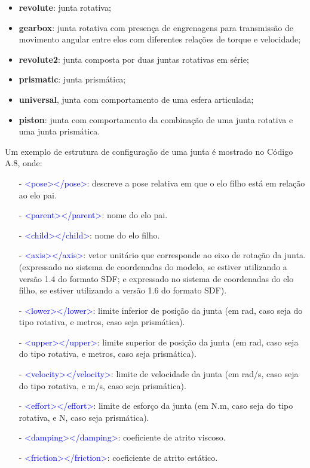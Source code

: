 \begin{itemize}
	\item \textbf{revolute}: junta rotativa; 
	\item \textbf{gearbox}: junta rotativa com presença de engrenagens para transmissão de movimento angular entre elos com diferentes relações de torque e velocidade; 
	\item \textbf{revolute2}: junta composta por duas juntas rotativas em série; 
	\item \textbf{prismatic}: junta prismática; \item \textbf{universal}, junta com comportamento de uma esfera articulada; 
	\item \textbf{piston}: junta com comportamento da combinação de uma junta rotativa e uma junta prismática.
\end{itemize}

Um exemplo de estrutura de configuração de uma junta é mostrado no Código A.8, onde:
\begin{itemize}
\setlength{\itemsep}{1pt}
\setlength{\parskip}{0pt}
\setlength{\parsep}{0pt}
\item[-] \textcolor{blue}{<pose></pose>}: descreve a pose relativa em que o elo filho está em relação ao elo pai.
\item[-] \textcolor{blue}{<parent></parent>}: nome do elo pai.
\item[-] \textcolor{blue}{<child></child>}: nome do elo filho.
\item[-] \textcolor{blue}{<axis></axis>}: vetor unitário que corresponde ao eixo de rotação da junta. (expressado no sistema de coordenadas do modelo, se estiver utilizando a versão 1.4 do formato SDF; e expressado no sistema de coordenadas do elo filho, se estiver utilizando a versão 1.6 do formato SDF).
\item[-] \textcolor{blue}{<lower></lower>}: limite inferior de posição da junta (em rad, caso seja do tipo rotativa, e metros, caso seja prismática).
\item[-] \textcolor{blue}{<upper></upper>}: limite superior de posição da junta (em rad, caso seja do tipo rotativa, e metros, caso seja prismática).
\item[-] \textcolor{blue}{<velocity></velocity>}: limite de velocidade da junta (em rad/s, caso seja do tipo rotativa, e m/s, caso seja prismática).
\item[-] \textcolor{blue}{<effort></effort>}: limite de esforço da junta (em N.m, caso seja do tipo rotativa, e N, caso seja prismática).
\item[-] \textcolor{blue}{<damping></damping>}: coeficiente de atrito viscoso.
\item[-] \textcolor{blue}{<friction></friction>}: coeficiente de atrito estático.
\end{itemize}


